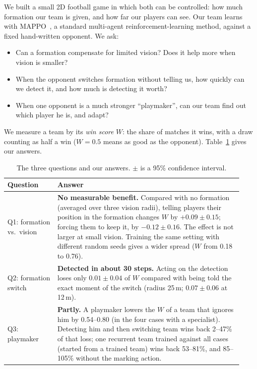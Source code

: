 \documentclass{article}
\begin{document}
We built a small 2D football game in which both can be controlled: how much formation our team is given, and how far
our players can see. Our team learns with MAPPO~\cite{yu2022mappo}, a standard multi-agent reinforcement-learning
method, against a fixed hand-written opponent. We ask:
\begin{itemize}[leftmargin=2.2em]
\item[\textbf{Q1}] Can a formation compensate for limited vision? Does it help more when vision is smaller?
\item[\textbf{Q2}] When the opponent switches formation without telling us, how quickly can we detect it, and how much
is detecting it worth?
\item[\textbf{Q3}] When one opponent is a much stronger ``playmaker'', can our team find out which player he is, and
adapt?
\end{itemize}
We measure a team by its \emph{win score} $W$: the share of matches it wins, with a draw counting as half a win
($W=0.5$ means as good as the opponent). Table~\ref{tab:summary} gives our answers.

\begin{table}[H]
\caption{The three questions and our answers. $\pm$ is a 95\% confidence interval.}
\label{tab:summary}
\centering
\small
\begin{tabular}{p{0.2\linewidth}p{0.74\linewidth}}
\toprule
Question & Answer \\
\midrule
Q1: formation vs.\ vision & \textbf{No measurable benefit.} Compared with no formation (averaged over three vision radii),
telling players their position in the formation changes $W$ by $+0.09\pm0.15$; forcing them to keep it, by
$-0.12\pm0.16$. The effect is not larger at small vision. Training
the same setting with different random seeds gives a wider spread ($W$ from 0.18 to 0.76). \\
Q2: formation switch & \textbf{Detected in about 30 steps.} Acting on the detection loses only $0.01\pm0.04$ of $W$
compared with being told the exact moment of the switch (radius 25\,m; $0.07\pm0.06$ at 12\,m). \\
Q3: playmaker & \textbf{Partly.} A playmaker lowers the $W$ of a team that ignores him by 0.54--0.80 (in the four cases with a specialist). Detecting him and
then switching team wins back 2--47\% of that loss; one recurrent team trained against all cases (started from a
trained team) wins back 53--81\%, and 85--105\% without the marking action. \\
\bottomrule
\end{tabular}
\end{table}
\end{document}
